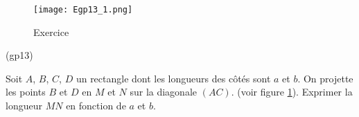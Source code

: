 \begin{figure}[h!]
  \centering
  \texttt{[image: Egp13\_1.png]}
  \caption{Exercice }
  \label{fig:Egp13_1}
\end{figure}

\begin{tiny}(gp13)\end{tiny} Soit $A$, $B$, $C$, $D$  un rectangle dont les longueurs des côtés sont $a$ et $b$. On projette les points $B$ et $D$ en $M$ et $N$ sur la diagonale $(AC)$. (voir figure \ref{fig:Egp13_1}).\newline
Exprimer la longueur $MN$ en fonction de $a$ et $b$.
